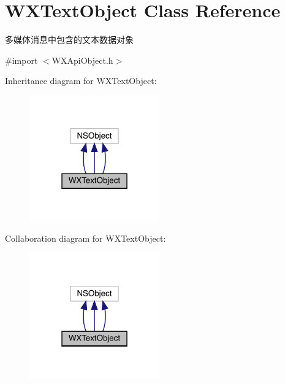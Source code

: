 \hypertarget{interface_w_x_text_object}{}\section{W\+X\+Text\+Object Class Reference}
\label{interface_w_x_text_object}


多媒体消息中包含的文本数据对象  




{\ttfamily \#import $<$W\+X\+Api\+Object.\+h$>$}



Inheritance diagram for W\+X\+Text\+Object\+:\nopagebreak
\begin{figure}[H]
\begin{center}
\leavevmode
\includegraphics[width=159pt]{interface_w_x_text_object__inherit__graph}
\end{center}
\end{figure}


Collaboration diagram for W\+X\+Text\+Object\+:\nopagebreak
\begin{figure}[H]
\begin{center}
\leavevmode
\includegraphics[width=159pt]{interface_w_x_text_object__coll__graph}
\end{center}
\end{figure}
